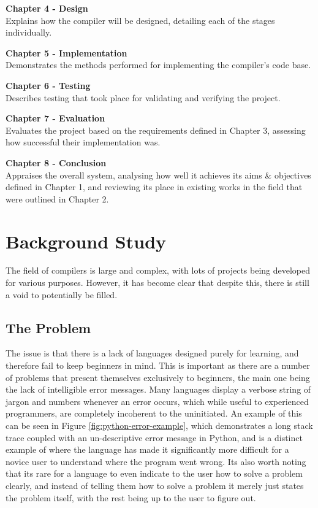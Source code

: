 \documentclass[
]{report}
\begin{document}
\textbf{Chapter 4 - Design}\\
Explains how the compiler will be designed, detailing each of the stages
individually.

\textbf{Chapter 5 - Implementation}\\
Demonstrates the methods performed for implementing the compiler's code
base.

\textbf{Chapter 6 - Testing}\\
Describes testing that took place for validating and verifying the
project.

\textbf{Chapter 7 - Evaluation}\\
Evaluates the project based on the requirements defined in Chapter 3,
assessing how successful their implementation was.

\textbf{Chapter 8 - Conclusion}\\
Appraises the overall system, analysing how well it achieves its aims \&
objectives defined in Chapter 1, and reviewing its place in existing
works in the field that were outlined in Chapter 2.


\chapter{Background Study}
The field of compilers is large and complex, with lots of projects
being developed for various purposes. However, it has become
clear that despite this, there is still a void to potentially be
filled.

\section{The Problem}
The issue is that there is a lack of languages designed purely for
learning, and therefore fail to keep beginners in mind. This is important
as there are a number of problems that present themselves exclusively to
beginners, the main one being the lack of intelligible error messages.
Many languages display a verbose string of jargon and numbers whenever
an error occurs, which while useful to experienced programmers, are
completely incoherent to the uninitiated. An example of this can be
seen in Figure \ref{fig:python-error-example}, which demonstrates a
long stack trace coupled with an un-descriptive error message in Python,
and is a distinct example of where the language has made it significantly
more difficult for a novice user to understand where the program went wrong.
Its also worth noting that its rare for a language to even indicate to
the user how to solve a problem clearly, and instead of telling them how
to solve a problem it merely just states the problem itself, with the
rest being up to the user to figure out.
\end{document}
